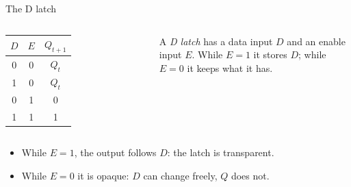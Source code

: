 \documentclass[10pt]{wosm-slides}
\begin{document}
\begin{frame}{The D latch}
  \begin{columns}[c, totalwidth=\textwidth]
      \centering
      \begin{tabular}{@{}cc|c@{}}
        $D$ & $E$ & $Q_{t+1}$ \\
        \midrule
        0 & 0 & $Q_t$ \\
        1 & 0 & $Q_t$ \\
        0 & 1 & 0 \\
        1 & 1 & 1 \\
      \end{tabular}
      \begin{definition}[D latch]
        A \emph{D latch} has a data input $D$ and an enable input $E$. While $E = 1$
        it stores $D$; while $E = 0$ it keeps what it has.
      \end{definition}
  \end{columns}

  \bigskip
  \begin{itemize}
    \item While $E = 1$, the output follows $D$: the latch is \alert{transparent}.
    \item While $E = 0$ it is \alert{opaque}: $D$ can change freely, $Q$ does not.
  \end{itemize}
\end{frame}
\end{document}
